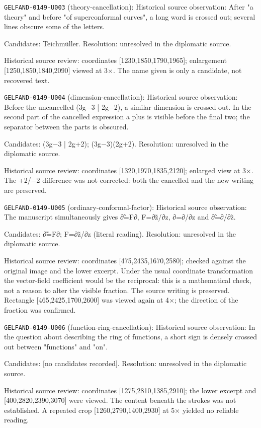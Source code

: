 \noindent\texttt{GELFAND-0149-U003} (theory-cancellation): Historical source observation: After "a theory" and before "of superconformal curves", a long word is crossed out; several lines obscure some of the letters.\par
Candidates: Teichmüller. Resolution: unresolved in the diplomatic source.\par
Historical source review: coordinates [1230,1850,1790,1965]; enlargement [1250,1850,1840,2090] viewed at 3×. The name given is only a candidate, not recovered text.\par

\noindent\texttt{GELFAND-0149-U004} (dimension-cancellation): Historical source observation: Before the uncancelled (3g−3 | 2g−2), a similar dimension is crossed out. In the second part of the cancelled expression a plus is visible before the final two; the separator between the parts is obscured.\par
Candidates: (3g−3 | 2g+2); (3g−3)(2g+2). Resolution: unresolved in the diplomatic source.\par
Historical source review: coordinates [1320,1970,1835,2120]; enlarged view at 3×. The +2/−2 difference was not corrected: both the cancelled and the new writing are preserved.\par

\noindent\texttt{GELFAND-0149-U005} (ordinary-conformal-factor): Historical source observation: The manuscript simultaneously gives ∂̃=F∂, F=∂z̃/∂z, ∂=∂/∂z and ∂̃=∂/∂z̃.\par
Candidates: ∂̃=F∂; F=∂z̃/∂z (literal reading). Resolution: unresolved in the diplomatic source.\par
Historical source review: coordinates [475,2435,1670,2580]; checked against the original image and the lower excerpt. Under the usual coordinate transformation the vector-field coefficient would be the reciprocal: this is a mathematical check, not a reason to alter the visible fraction. The source writing is preserved. Rectangle [465,2425,1700,2600] was viewed again at 4×; the direction of the fraction was confirmed.\par

\noindent\texttt{GELFAND-0149-U006} (function-ring-cancellation): Historical source observation: In the question about describing the ring of functions, a short sign is densely crossed out between "functions" and "on".\par
Candidates: [no candidates recorded]. Resolution: unresolved in the diplomatic source.\par
Historical source review: coordinates [1275,2810,1385,2910]; the lower excerpt and [400,2820,2390,3070] were viewed. The content beneath the strokes was not established. A repeated crop [1260,2790,1400,2930] at 5× yielded no reliable reading.\par

